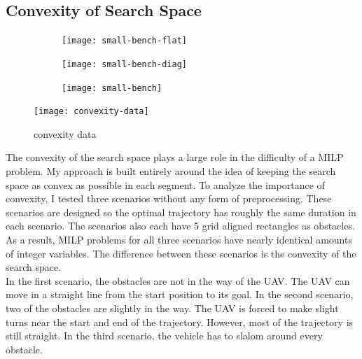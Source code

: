 \clearpage
\subsection{Convexity of Search Space}

\begin{figure}
	\centering
	\begin{subfigure}[t]{1\columnwidth}
        		\texttt{[image: small-bench-flat]}
        		\caption{}
        		\label{fig:convex-straight}
	\end{subfigure}
	\par\bigskip
	\begin{subfigure}[t]{1\columnwidth}
        		\texttt{[image: small-bench-diag]}
        		\caption{}
        		 \label{fig:convex-diag}
	\end{subfigure}	
	\par\bigskip
	\begin{subfigure}[t]{0.8\columnwidth}
        		\texttt{[image: small-bench]}
        		\caption{}
        		 \label{fig:convex-full}
	\end{subfigure}	
    \caption{}
    \label{fig:}     
\end{figure}
\begin{figure}[]
	\centering
	\texttt{[image: convexity-data]}
	\caption{convexity data}
	\label{fig:convex-data}
\end{figure}
The convexity of the search space plays a large role in the difficulty of a MILP problem. My approach is built entirely around the idea of keeping the search space as convex as possible in each segment. To analyze  the importance of convexity, I tested three scenarios without any form of preprocessing. These scenarios are designed so the optimal trajectory has roughly the same duration in each scenario. The scenarios also each have 5 grid aligned rectangles as obstacles.\\
As a result, MILP problems for all three scenarios have nearly identical amounts of integer variables. The difference between these scenarios is the convexity of the search space. \\
In the first scenario, the obstacles are not in the way of the UAV. The UAV can move in a straight line from the start position to its goal. In the second scenario, two of the obstacles are slightly in the way. The UAV is forced to make slight turns near the start and end of the trajectory. However, most of the trajectory is still straight. In the third scenario, the vehicle has to slalom around every obstacle.\\

